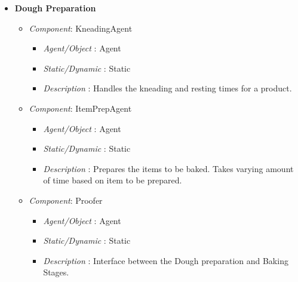 \documentclass[11pt, a4paper]{article}
\begin{document}
\begin{itemize}
	\item \textbf{Dough Preparation}
	\begin{itemize}
	\item \textit{Component}: KneadingAgent
	\begin{itemize}
		\item \textit{Agent/Object} : Agent
		\item \textit{Static/Dynamic} : Static
		\item \textit{Description} : Handles the kneading and resting times for a product.
	\end{itemize}
	\item \textit{Component}: ItemPrepAgent
	\begin{itemize}
		\item \textit{Agent/Object} : Agent
		\item \textit{Static/Dynamic} : Static
		\item \textit{Description} : Prepares the items to be baked. Takes varying amount of time based on item to be prepared.
	\end{itemize}
	\item \textit{Component}: Proofer
	\begin{itemize}
		\item \textit{Agent/Object} : Agent
		\item \textit{Static/Dynamic} : Static
		\item \textit{Description} : Interface between the Dough preparation and Baking Stages.
	\end{itemize}
	\end{itemize}


\end{itemize}
\end{document}
